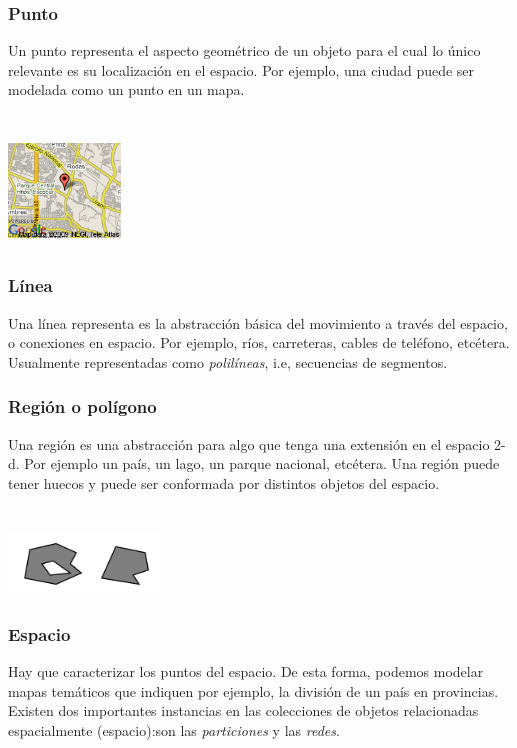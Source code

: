 \documentclass[a4paper,12pt,oneside]{report}
\begin{document}
\subsubsection*{Punto}
Un punto representa el aspecto geom\'etrico de un objeto para el cual lo \'unico relevante es su localizaci\'on en el espacio.
Por ejemplo, una ciudad puede ser modelada como un punto en un mapa.\\
\ \\
\begin{center}\includegraphics[width=3cm,height=3cm]{Imagenes/mapa1.png}
\end{center}
\subsubsection*{L\'inea}
Una l\'inea representa es la abstracci\'on b\'asica del movimiento a trav\'es del espacio, o conexiones en espacio.
Por ejemplo, r\'ios, carreteras, cables de tel\'efono, etc\'etera.\\
Usualmente representadas como \textit{polil\'ineas}, i.e, secuencias de segmentos.
\subsubsection*{Regi\'on o pol\'igono}
Una regi\'on es una abstracci\'on para algo que tenga una extensi\'on en el espacio 2-d. Por ejemplo un pa\'is, un lago, un parque nacional, etc\'etera. Una regi\'on puede tener huecos y puede ser conformada por distintos objetos del espacio.\\
\ \\
\begin{center}\includegraphics[width=4cm,height=1.8cm]{Imagenes/poligonos.png}
\end{center}
\subsubsection*{Espacio}
Hay que caracterizar los puntos del espacio. De esta forma, podemos modelar mapas tem\'aticos que indiquen por ejemplo, la divisi\'on de un pa\'is en provincias. Existen dos importantes instancias en las colecciones de objetos relacionadas espacialmente (espacio):son las \textit{particiones} y las \textit{redes}.
\end{document}
